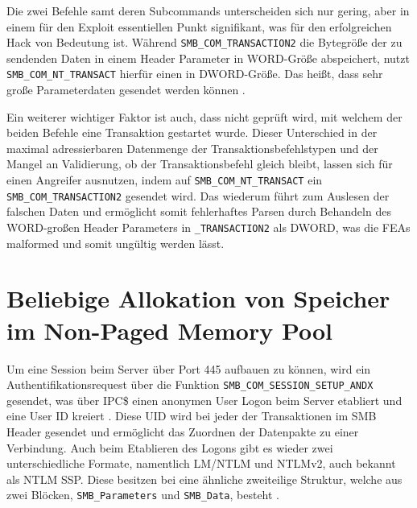 \documentclass[DIV=12,headings=normal,pdftex,headinclude=false,footinclude=false,final]{scrreprt}
\begin{document}
\noindent
Die zwei Befehle samt deren Subcommands unterscheiden sich nur gering, aber in einem für den Exploit essentiellen Punkt signifikant, was für den erfolgreichen Hack von Bedeutung ist. Während \verb|SMB_COM_TRANSACTION2| die Bytegröße der zu sendenden Daten in einem Header Parameter in WORD-Größe abspeichert, nutzt \verb|SMB_COM_NT_TRANSACT| hierfür einen in DWORD-Größe. Das heißt, dass sehr große Parameterdaten gesendet werden können \cite{CP}.

\noindent
Ein weiterer wichtiger Faktor ist auch, dass nicht geprüft wird, mit welchem der beiden Befehle eine Transaktion gestartet wurde. Dieser Unterschied in der maximal adressierbaren Datenmenge der Transaktionsbefehlstypen und der Mangel an Validierung, ob der Transaktionsbefehl gleich bleibt, lassen sich für einen Angreifer ausnutzen, indem auf \verb|SMB_COM_NT_TRANSACT| ein \verb|SMB_COM_TRANSACTION2| gesendet wird\cite{SS:EB}. Das wiederum führt zum Auslesen der falschen Daten und ermöglicht somit fehlerhaftes Parsen durch Behandeln des WORD-großen Header Parameters in \verb|_TRANSACTION2| als DWORD, was die FEAs malformed und somit ungültig werden lässt\cite{CP}.

\section{Beliebige Allokation von Speicher im Non-Paged Memory Pool}\label{sec:MemAlloc}
Um eine Session beim Server über Port 445 aufbauen zu können, wird ein Authentifikationsrequest über die Funktion \verb|SMB_COM_SESSION_SETUP_ANDX| gesendet, was über IPC\$ einen anonymen User Logon beim Server etabliert und eine User ID kreiert \cite{MS:Auth}. Diese UID wird bei jeder der Transaktionen im SMB Header gesendet und ermöglicht das Zuordnen der Datenpakte zu einer Verbindung\cite{SS:EB}. Auch beim Etablieren des Logons gibt es wieder zwei unterschiedliche Formate, namentlich LM/NTLM und NTLMv2, auch bekannt als NTLM SSP. Diese besitzen bei eine ähnliche zweiteilige Struktur, welche aus zwei Blöcken, \verb|SMB_Parameters| und \verb|SMB_Data|, besteht \cite{MS:SMBCom}.
\end{document}
